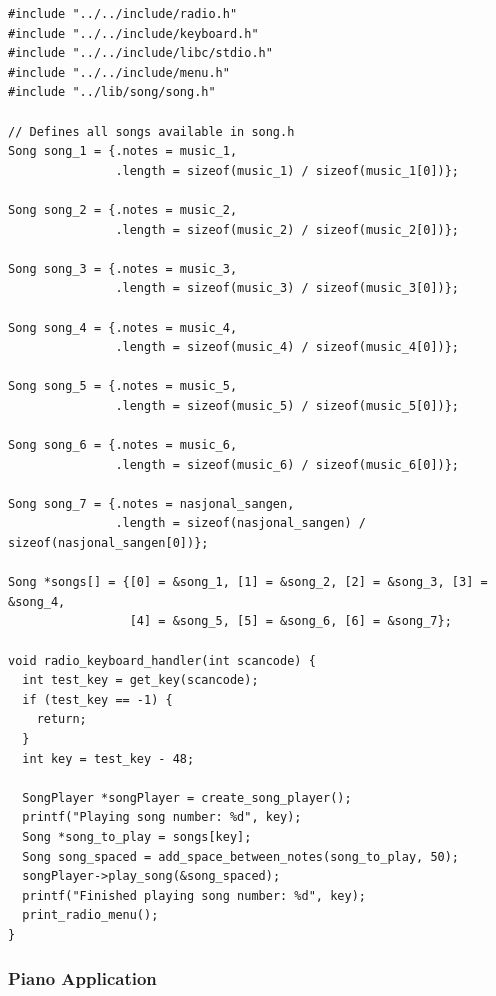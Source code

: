 \documentclass[../main.tex]{subfiles}
\begin{document}
\begin{listing}[H]
    \begin{verbatim}
#include "../../include/radio.h"
#include "../../include/keyboard.h"
#include "../../include/libc/stdio.h"
#include "../../include/menu.h"
#include "../lib/song/song.h"

// Defines all songs available in song.h
Song song_1 = {.notes = music_1,
               .length = sizeof(music_1) / sizeof(music_1[0])};

Song song_2 = {.notes = music_2,
               .length = sizeof(music_2) / sizeof(music_2[0])};

Song song_3 = {.notes = music_3,
               .length = sizeof(music_3) / sizeof(music_3[0])};

Song song_4 = {.notes = music_4,
               .length = sizeof(music_4) / sizeof(music_4[0])};

Song song_5 = {.notes = music_5,
               .length = sizeof(music_5) / sizeof(music_5[0])};

Song song_6 = {.notes = music_6,
               .length = sizeof(music_6) / sizeof(music_6[0])};

Song song_7 = {.notes = nasjonal_sangen,
               .length = sizeof(nasjonal_sangen) / sizeof(nasjonal_sangen[0])};

Song *songs[] = {[0] = &song_1, [1] = &song_2, [2] = &song_3, [3] = &song_4,
                 [4] = &song_5, [5] = &song_6, [6] = &song_7};

void radio_keyboard_handler(int scancode) {
  int test_key = get_key(scancode);
  if (test_key == -1) {
    return;
  }
  int key = test_key - 48;

  SongPlayer *songPlayer = create_song_player();
  printf("Playing song number: %d", key);
  Song *song_to_play = songs[key];
  Song song_spaced = add_space_between_notes(song_to_play, 50);
  songPlayer->play_song(&song_spaced);
  printf("Finished playing song number: %d", key);
  print_radio_menu();
}
    \end{verbatim}
    \caption{Implementation of \texttt{radio.c}}
    \label{lst:radio_c}
\end{listing}


\subsubsection{Piano Application}
\label{apx:piano_application}
\end{document}
